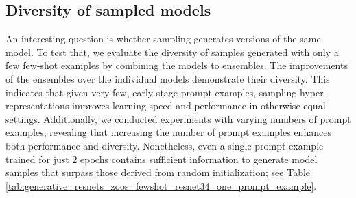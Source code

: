 \subsection{Diversity of sampled models}
\label{sec:sampling_diversity}
An interesting question is whether sampling \ourmethod generates versions of the same model. To test that,  we evaluate the diversity of samples generated with only a few few-shot examples by combining the models to ensembles. 
The improvements of the ensembles over the individual models demonstrate their diversity.
This indicates that given very few, early-stage prompt examples, sampling hyper-representations improves learning speed and performance in otherwise equal settings. 
Additionally, we conducted experiments with varying numbers of prompt examples, revealing that increasing the number of prompt examples enhances both performance and diversity. 
Nonetheless, even a single prompt example trained for just 2 epochs contains sufficient information to generate model samples that surpass those derived from random initialization; see Table \ref{tab:generative_resnets_zoos_fewshot_resnet34_one_prompt_example}.

